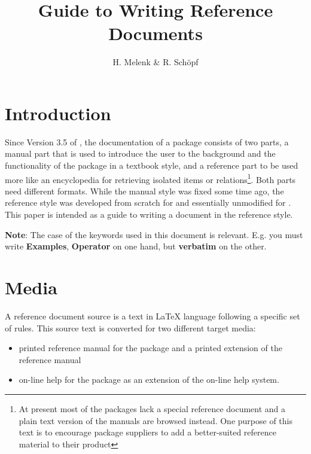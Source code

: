 


\title{Guide to Writing \REDUCE Reference Documents}
\date{}
\author{H. Melenk \& R. Sch\"opf}
\maketitle

\section{Introduction}

Since Version 3.5 of \REDUCE, the documentation of a package consists of two
parts, a manual part that is used to introduce the user to the background
and the functionality of the package in a textbook style, and a reference
part to be used more like an encyclopedia for retrieving isolated items or
relations\footnote{%
At present most of the packages lack a special reference document and a
plain text version of the manuals are browsed instead. One purpose of this
text is to encourage package suppliers to add a better-suited reference
material to their product}. Both parts need different formats. While the
\REDUCE manual style was fixed some time ago, the \REDUCE reference style
was developed from scratch for  and essentially unmodified for
.  This paper is intended as a guide to writing a document in
the reference style.

{\bf Note}: The case of the keywords used in this document is relevant. E.g.
you must write {\bf Examples}, {\bf Operator} on one hand, but {\bf verbatim}
on the other.

\section{Media}

A reference document source is a text in \LaTeX{} language following a
specific set of rules. This source text is converted for two different
target media:

\begin{itemize}
\item  printed reference manual for the package and a printed extension of
the \REDUCE reference manual

\item  on-line help for the package as an extension of the \REDUCE on-line
help system.
\end{itemize}

